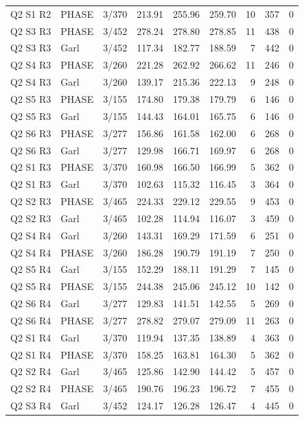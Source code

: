 \begin{longtable}{llrrrrrrr}
Q2 S1 R2 & PHASE & 3/370 & 213.91 & 255.96 & 259.70 & 10 & 357 & 0 \\
Q2 S3 R3 & PHASE & 3/452 & 278.24 & 278.80 & 278.85 & 11 & 438 & 0 \\
Q2 S3 R3 & Garl & 3/452 & 117.34 & 182.77 & 188.59 & 7 & 442 & 0 \\
Q2 S4 R3 & PHASE & 3/260 & 221.28 & 262.92 & 266.62 & 11 & 246 & 0 \\
Q2 S4 R3 & Garl & 3/260 & 139.17 & 215.36 & 222.13 & 9 & 248 & 0 \\
Q2 S5 R3 & PHASE & 3/155 & 174.80 & 179.38 & 179.79 & 6 & 146 & 0 \\
Q2 S5 R3 & Garl & 3/155 & 144.43 & 164.01 & 165.75 & 6 & 146 & 0 \\
Q2 S6 R3 & PHASE & 3/277 & 156.86 & 161.58 & 162.00 & 6 & 268 & 0 \\
Q2 S6 R3 & Garl & 3/277 & 129.98 & 166.71 & 169.97 & 6 & 268 & 0 \\
Q2 S1 R3 & PHASE & 3/370 & 160.98 & 166.50 & 166.99 & 5 & 362 & 0 \\
Q2 S1 R3 & Garl & 3/370 & 102.63 & 115.32 & 116.45 & 3 & 364 & 0 \\
Q2 S2 R3 & PHASE & 3/465 & 224.33 & 229.12 & 229.55 & 9 & 453 & 0 \\
Q2 S2 R3 & Garl & 3/465 & 102.28 & 114.94 & 116.07 & 3 & 459 & 0 \\
Q2 S4 R4 & Garl & 3/260 & 143.31 & 169.29 & 171.59 & 6 & 251 & 0 \\
Q2 S4 R4 & PHASE & 3/260 & 186.28 & 190.79 & 191.19 & 7 & 250 & 0 \\
Q2 S5 R4 & Garl & 3/155 & 152.29 & 188.11 & 191.29 & 7 & 145 & 0 \\
Q2 S5 R4 & PHASE & 3/155 & 244.38 & 245.06 & 245.12 & 10 & 142 & 0 \\
Q2 S6 R4 & Garl & 3/277 & 129.83 & 141.51 & 142.55 & 5 & 269 & 0 \\
Q2 S6 R4 & PHASE & 3/277 & 278.82 & 279.07 & 279.09 & 11 & 263 & 0 \\
Q2 S1 R4 & Garl & 3/370 & 119.94 & 137.35 & 138.89 & 4 & 363 & 0 \\
Q2 S1 R4 & PHASE & 3/370 & 158.25 & 163.81 & 164.30 & 5 & 362 & 0 \\
Q2 S2 R4 & Garl & 3/465 & 125.86 & 142.90 & 144.42 & 5 & 457 & 0 \\
Q2 S2 R4 & PHASE & 3/465 & 190.76 & 196.23 & 196.72 & 7 & 455 & 0 \\
Q2 S3 R4 & Garl & 3/452 & 124.17 & 126.28 & 126.47 & 4 & 445 & 0 \\

\end{longtable}
